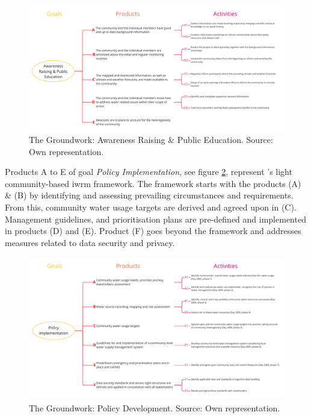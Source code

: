 \begin{figure}[!htp]
    \centering
    \includegraphics[width=1.0\textwidth]{figures/2023_MA_results_awareness.pdf}
    \decoRule
    \caption[PRC: The Groundwork - Awareness Raising \& Public Education]{The Groundwork: Awareness Raising \& Public Education. Source: Own representation.}
    \label{fig:res_groundwork_ar}
\end{figure}

Products A to E of goal \textit{Policy Implementation}, see figure \ref{fig:res_groundwork_pd}, represent \citeauthor{dayCommunitybasedWaterResources2009}'s \citeyear{dayCommunitybasedWaterResources2009} light community-based \acrshort{iwrm} framework. The framework starts with the products (A) \& (B) by identifying and assessing prevailing circumstances and requirements. From this, community water usage targets are derived and agreed upon in (C). Management guidelines, and prioritisation plans are pre-defined and implemented in products (D) and (E). Product (F) goes beyond the framework and addresses measures related to data security and privacy.

\begin{figure}[!htp]
    \centering
    \includegraphics[width=1.0\textwidth]{figures/2023_MA_results_policy.pdf}
    \decoRule
    \caption[PRC: The Groundwork - Policy Development]{The Groundwork: Policy Development. Source: Own representation.}
    \label{fig:res_groundwork_pd}
\end{figure}

